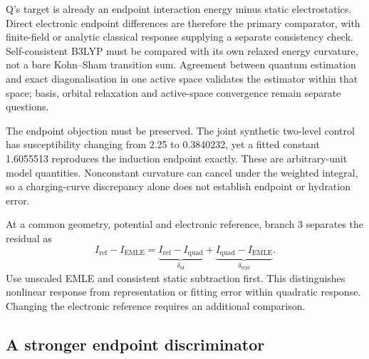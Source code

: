 \documentclass{article}
\begin{document}
Q's target is already an endpoint interaction energy minus static electrostatics. Direct electronic endpoint differences are therefore the primary comparator, with finite-field or analytic classical response supplying a separate consistency check. Self-consistent B3LYP must be compared with its own relaxed energy curvature, not a bare Kohn--Sham transition sum. Agreement between quantum estimation and exact diagonalisation in one active space validates the estimator within that space; basis, orbital relaxation and active-space convergence remain separate questions.

The endpoint objection must be preserved. The joint synthetic two-level control has susceptibility changing from 2.25 to 0.3840232, yet a fitted constant 1.6055513 reproduces the induction endpoint exactly. These are arbitrary-unit model quantities. Nonconstant curvature can cancel under the weighted integral, so a charging-curve discrepancy alone does not establish endpoint or hydration error.

At a common geometry, potential and electronic reference, branch 3 separates the residual as
\begin{equation*}
I_{\mathrm{ref}}-I_{\mathrm{EMLE}}=
\underbrace{I_{\mathrm{ref}}-I_{\mathrm{quad}}}_{\delta_{\mathrm{nl}}}
+\underbrace{I_{\mathrm{quad}}-I_{\mathrm{EMLE}}}_{\delta_{\mathrm{repr}}}.
\end{equation*}
Use unscaled EMLE and consistent static subtraction first. This distinguishes nonlinear response from representation or fitting error within quadratic response. Changing the electronic reference requires an additional comparison.

\subsection{A stronger endpoint discriminator}
\end{document}
